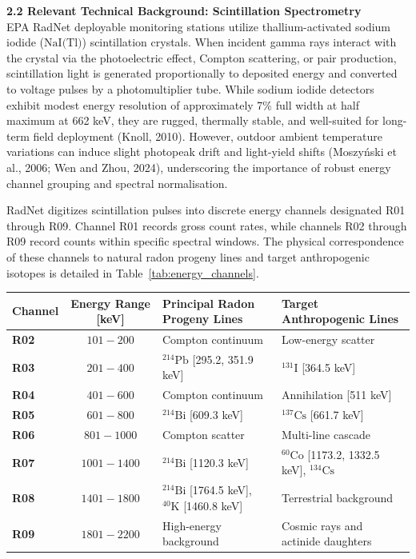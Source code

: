 \documentclass[11pt,a4paper]{article}
\begin{document}
\begin{framed}
\vspace{0.6em}
\noindent\textbf{2.2 Relevant Technical Background: Scintillation Spectrometry}\\[0.3em]
EPA RadNet deployable monitoring stations utilize thallium-activated sodium iodide ($\text{NaI(Tl)}$) scintillation crystals. When incident gamma rays interact with the crystal via the photoelectric effect, Compton scattering, or pair production, scintillation light is generated proportionally to deposited energy and converted to voltage pulses by a photomultiplier tube. While sodium iodide detectors exhibit modest energy resolution of approximately 7\% full width at half maximum at 662 keV, they are rugged, thermally stable, and well-suited for long-term field deployment (Knoll, 2010). However, outdoor ambient temperature variations can induce slight photopeak drift and light-yield shifts (Moszyński et al., 2006; Wen and Zhou, 2024), underscoring the importance of robust energy channel grouping and spectral normalisation.

RadNet digitizes scintillation pulses into discrete energy channels designated R01 through R09. Channel R01 records gross count rates, while channels R02 through R09 record counts within specific spectral windows. The physical correspondence of these channels to natural radon progeny lines and target anthropogenic isotopes is detailed in Table~\ref{tab:energy_channels}.

\begin{center}
\label{tab:energy_channels}
\small
\begin{tabularx}{\textwidth}{l c X X}
\toprule
\textbf{Channel} & \textbf{Energy Range [keV]} & \textbf{Principal Radon Progeny Lines} & \textbf{Target Anthropogenic Lines} \\
\midrule
\textbf{R02} & $101 - 200$ & Compton continuum & Low-energy scatter \\
\textbf{R03} & $201 - 400$ & $^{214}\text{Pb}$ [295.2, 351.9 keV] & $^{131}\text{I}$ [364.5 keV] \\
\textbf{R04} & $401 - 600$ & Compton continuum & Annihilation [511 keV] \\
\textbf{R05} & $601 - 800$ & $^{214}\text{Bi}$ [609.3 keV] & $^{137}\text{Cs}$ [661.7 keV] \\
\textbf{R06} & $801 - 1000$ & Compton scatter & Multi-line cascade \\
\textbf{R07} & $1001 - 1400$ & $^{214}\text{Bi}$ [1120.3 keV] & $^{60}\text{Co}$ [1173.2, 1332.5 keV], $^{134}\text{Cs}$ \\
\textbf{R08} & $1401 - 1800$ & $^{214}\text{Bi}$ [1764.5 keV], $^{40}\text{K}$ [1460.8 keV] & Terrestrial background \\
\textbf{R09} & $1801 - 2200$ & High-energy background & Cosmic rays and actinide daughters \\
\bottomrule
\end{tabularx}
\end{center}


\end{framed}
\end{document}
